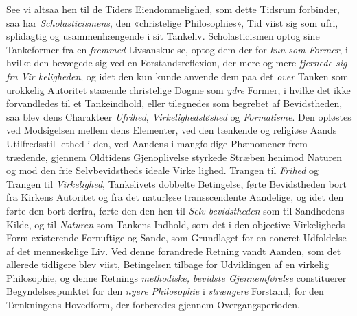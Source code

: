 See vi altsaa hen til de Tiders Eiendommelighed, som
dette Tidsrum forbinder, saa har \emph{Scholasticismens}, den
«christelige Philosophies», Tid viist sig som ufri, splidagtig og
usammenhængende i sit Tankeliv. Scholasticismen optog sine
 Tankeformer fra en \emph{fremmed} Livsanskuelse, optog dem der\-%
for \emph{kun som Former}, i hvilke den bevægede sig ved en
Forstandsreflexion, der mere og mere \emph{fjernede sig fra Vir\-%
keligheden}, og idet den kun kunde anvende dem paa det
\emph{over} Tanken som urokkelig Autoritet staaende christelige
Dogme som \emph{ydre} Former, i hvilke det ikke forvandledes til
et Tankeindhold, eller tilegnedes som begrebet af Bevidstheden,
saa blev dens Charakteer \emph{Ufrihed}, \emph{Virkelighedsløshed} og
\emph{Formalisme}. Den opløstes ved Modsigelsen mellem dens
Elementer, ved den tænkende og religiøse Aands Utilfredsstil\-%
lethed i den, ved Aandens i mangfoldige Phænomener frem\-%
trædende, gjennem Oldtidens Gjenoplivelse styrkede Stræben
henimod Naturen og mod den frie Selvbevidstheds ideale Virke\-%
lighed. Trangen til \emph{Frihed} og Trangen til \emph{Virkelighed},
Tankelivets dobbelte Betingelse, førte Bevidstheden bort fra
Kirkens Autoritet og fra det naturløse transscendente Aandelige,
og idet den førte den bort derfra, førte den den hen til \emph{Selv\-%
bevidstheden} som til Sandhedens Kilde, og til \emph{Naturen} som
Tankens Indhold, som det i den objective Virkeligheds Form
existerende Fornuftige og Sande, som Grundlaget for en concret
Udfoldelse af det menneskelige Liv. Ved denne forandrede
Retning vandt Aanden, som det allerede tidligere blev viist,
Betingelsen tilbage for Udviklingen af en virkelig Philosophie,
og denne Retnings \emph{methodiske, bevidste Gjennemførelse}
constituerer Begyndelsespunktet for den \emph{nyere Philosophie}
i \emph{strængere} Forstand, for den Tænkningens Hovedform, der
forberedes gjennem Overgangsperioden.

